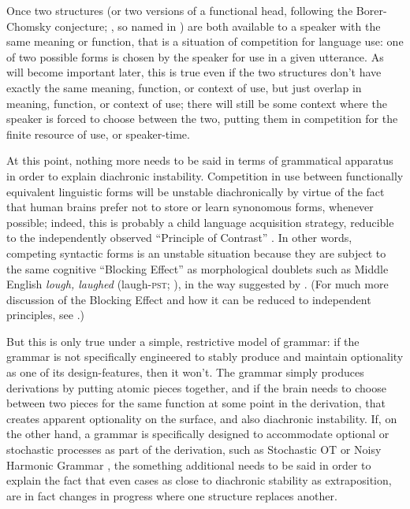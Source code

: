 Once two structures (or two versions of a functional head, following the Borer-Chomsky conjecture; \citealt{borer1984, kroch1994}, so named in \citealt{baker2008}) are both available to a speaker with the same meaning or function, that is a situation of competition for language use: one of two possible forms is chosen by the speaker for use in a given utterance. As will become important later, this is true even if the two structures don't have exactly the same meaning, function, or context of use, but just overlap in meaning, function, or context of use; there will still be some context where the speaker is forced to choose between the two, putting them in competition for the finite resource of use, or speaker-time.

At this point, nothing more needs to be said in terms of grammatical apparatus in order to explain diachronic instability. Competition in use between functionally equivalent linguistic forms will be unstable diachronically by virtue of the fact that human brains prefer not to store or learn synonomous forms, whenever possible; indeed, this is probably a child language acquisition strategy, reducible to the independently observed ``Principle of Contrast'' \citep[][inter alia]{clark1987, clark1990}. In other words, competing syntactic forms is an unstable situation because they are subject to the same cognitive ``Blocking Effect'' as morphological doublets such as Middle English \textsl{lough, laughed} (laugh-\textsc{pst}; \citealt{taylor1994}), in the way suggested by \citet{kroch1994}.  (For much more discussion of the Blocking Effect and how it can be reduced to independent principles, see \citealt{fruehwaldwallenberginprep}.)

But this is only true under a simple, restrictive model of grammar: if the grammar is not specifically engineered to stably produce and maintain optionality as one of its design-features, then it won't. The grammar simply produces derivations by putting atomic pieces together, and if the brain needs to choose between two pieces for the same function at some point in the derivation, that creates apparent optionality on the surface, and also diachronic instability. If, on the other hand, a grammar is specifically designed to accommodate optional or stochastic processes as part of the derivation, such as Stochastic OT \citep{boersmahayes2001} or Noisy Harmonic Grammar \citep[][and much subsequent work]{boersmapater2008, pater2008}, the something additional needs to be said in order to explain the fact that even cases as close to diachronic stability as extraposition, are in fact changes in progress where one structure replaces another.

